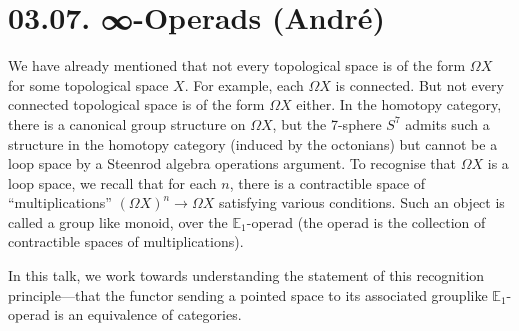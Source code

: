 \documentclass[a4paper]{amsart}
\numberwithin{figure}{section}
\theoremstyle{theorem}
\theoremstyle{definition}
\newcommand{\EE}{\mathbb{E}}
\begin{document}
%
%
%
%
%
%
%
%
%

\section{03.07. ∞-Operads (André)}

We have already mentioned that not every topological space is of the form $\Omega X$ for some topological space $X$. For example, each $\Omega X$ is connected. But not every connected topological space is of the form $\Omega X$ either. In the homotopy category, there is a canonical group structure on $\Omega X$, but the 7-sphere $S^7$ admits such a structure in the homotopy category (induced by the octonians) but cannot be a loop space by a Steenrod algebra operations argument. To recognise that $\Omega X$ is a loop space, we recall that for each $n$, there is a contractible space of ``multiplications'' $(\Omega X)^n → \Omega X$ satisfying various conditions. Such an object is called a group like monoid, over the $\EE_1$-operad (the operad is the collection of contractible spaces of multiplications). 

In this talk, we work towards understanding the statement of this recognition principle---that the functor sending a pointed space to its associated grouplike $\EE_1$-operad is an equivalence of categories.
\end{document}
